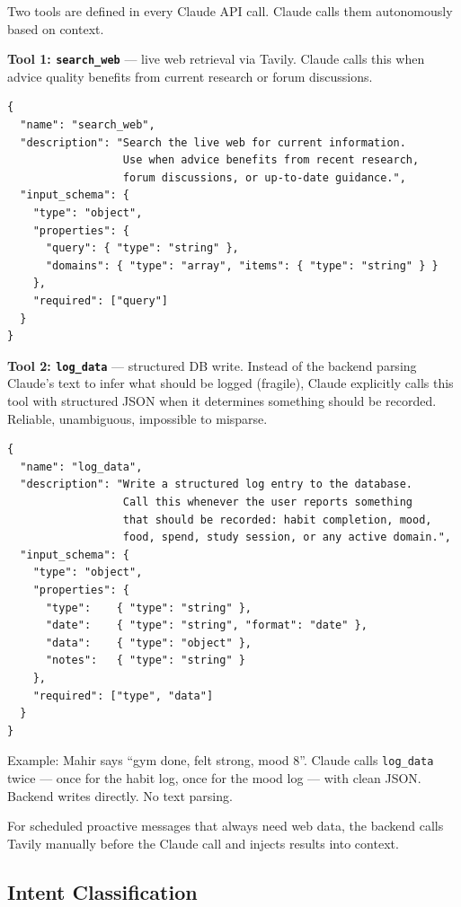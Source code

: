 \documentclass[12pt, a4paper]{article}
\begin{document}
Two tools are defined in every Claude API call. Claude calls them autonomously based on context.

\textbf{Tool 1: \texttt{search\_web}} --- live web retrieval via Tavily. Claude calls this when advice quality benefits from current research or forum discussions.

\begin{lstlisting}
{
  "name": "search_web",
  "description": "Search the live web for current information.
                  Use when advice benefits from recent research,
                  forum discussions, or up-to-date guidance.",
  "input_schema": {
    "type": "object",
    "properties": {
      "query": { "type": "string" },
      "domains": { "type": "array", "items": { "type": "string" } }
    },
    "required": ["query"]
  }
}
\end{lstlisting}

\textbf{Tool 2: \texttt{log\_data}} --- structured DB write. Instead of the backend parsing Claude's text to infer what should be logged (fragile), Claude explicitly calls this tool with structured JSON when it determines something should be recorded. Reliable, unambiguous, impossible to misparse.

\begin{lstlisting}
{
  "name": "log_data",
  "description": "Write a structured log entry to the database.
                  Call this whenever the user reports something
                  that should be recorded: habit completion, mood,
                  food, spend, study session, or any active domain.",
  "input_schema": {
    "type": "object",
    "properties": {
      "type":    { "type": "string" },
      "date":    { "type": "string", "format": "date" },
      "data":    { "type": "object" },
      "notes":   { "type": "string" }
    },
    "required": ["type", "data"]
  }
}
\end{lstlisting}

Example: Mahir says ``gym done, felt strong, mood 8''. Claude calls \texttt{log\_data} twice --- once for the habit log, once for the mood log --- with clean JSON. Backend writes directly. No text parsing.

For scheduled proactive messages that always need web data, the backend calls Tavily manually before the Claude call and injects results into context.

\subsection{Intent Classification}
\end{document}
